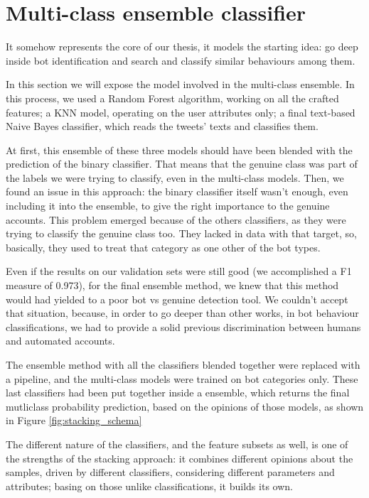 \section{Multi-class ensemble classifier}
It somehow represents the core of our thesis, it models the starting idea: go deep inside bot identification and search and classify similar behaviours among them.

In this section we will expose the model involved in the multi-class ensemble. In this process, we used a Random Forest algorithm, working on all the crafted features; a KNN model, operating on the user attributes only; a final text-based Naive Bayes classifier, which reads the tweets' texts and classifies them.

At first, this ensemble of these three models should have been blended with the prediction of the binary classifier. That means that the genuine class was part of the labels we were trying to classify, even in the multi-class models. Then, we found an issue in this approach: the binary classifier itself wasn't enough, even including it into the ensemble, to give the right importance to the genuine accounts. This problem emerged because of the others classifiers, as they were trying to classify the genuine class too. They lacked in data with that target, so, basically, they used to treat that category as one other of the bot types.

Even if the results on our validation sets were still good (we accomplished a F1 measure of 0.973), for the final ensemble method, we knew that this method would had yielded to a poor bot vs genuine detection tool. We couldn't accept that situation, because, in order to go deeper than other works, in bot behaviour classifications, we had to provide a solid previous discrimination between humans and automated accounts.

The ensemble method with all the classifiers blended together were replaced with a pipeline, and the multi-class models were trained on bot categories only.
These last classifiers had been put together inside a  ensemble, which returns the final mutliclass probability prediction, based on the opinions of those models, as shown in Figure \ref{fig:stacking_schema}

The different nature of the classifiers, and the feature subsets as well, is one of the strengths of the stacking approach: it combines different opinions about the samples, driven by different classifiers, considering different parameters and attributes; basing on those unlike classifications, it builds its own.

